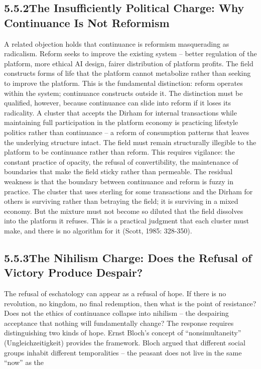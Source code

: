 \subsection{5.5.2\quad The Insufficiently Political Charge: Why Continuance Is Not Reformism}

A related objection holds that continuance is reformism masquerading as radicalism. Reform seeks to improve the existing system – better regulation of the platform, more ethical AI design, fairer distribution of platform profits. The field constructs forms of life that the platform cannot metabolize rather than seeking to improve the platform. This is the fundamental distinction: reform operates within the system; continuance constructs outside it. The distinction must be qualified, however, because continuance can slide into reform if it loses its radicality. A cluster that accepts the Dirham for internal transactions while maintaining full participation in the platform economy is practicing lifestyle politics rather than continuance – a reform of consumption patterns that leaves the underlying structure intact. The field must remain structurally illegible to the platform to be continuance rather than reform. This requires vigilance: the constant practice of opacity, the refusal of convertibility, the maintenance of boundaries that make the field sticky rather than permeable. The residual weakness is that the boundary between continuance and reform is fuzzy in practice. The cluster that uses sterling for some transactions and the Dirham for others is surviving rather than betraying the field; it is surviving in a mixed economy. But the mixture must not become so diluted that the field dissolves into the platform it refuses. This is a practical judgment that each cluster must make, and there is no algorithm for it (Scott, 1985: 328-350).

\subsection{5.5.3\quad The Nihilism Charge: Does the Refusal of Victory Produce Despair?}

The refusal of eschatology can appear as a refusal of hope. If there is no revolution, no kingdom, no final redemption, then what is the point of resistance? Does not the ethics of continuance collapse into nihilism – the despairing acceptance that nothing will fundamentally change? The response requires distinguishing two kinds of hope. Ernst Bloch’s concept of “nonsimultaneity” (Ungleichzeitigkeit) provides the framework. Bloch argued that different social groups inhabit different temporalities – the peasant does not live in the same “now” as the

